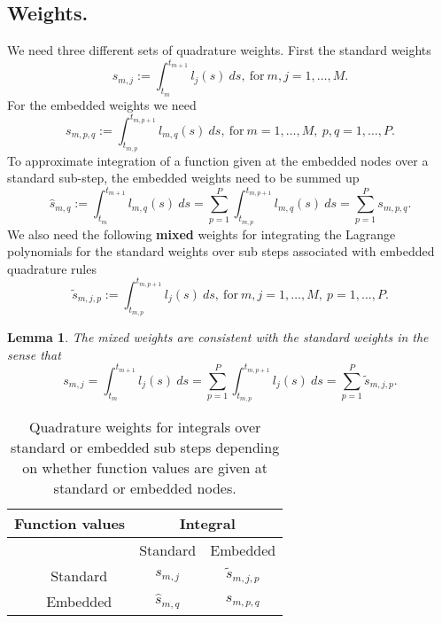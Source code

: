 \documentclass{article}
\newtheorem{lemma}{Lemma}
\begin{document}
\subsection*{Weights.}
We need three different sets of quadrature weights.
First the standard weights
\begin{equation}
	s_{m,j} := \int_{t_{m}}^{t_{m+1}} l_{j}(s)~ds, \ \text{for} \ m,j=1,\ldots,M.
\end{equation}
For the embedded weights we need
\begin{equation}
	s_{m,p,q} := \int_{t_{m,p}}^{t_{m,p+1}} l_{m,q}(s)~ds, \ \text{for} \ m=1,\ldots,M, \ p,q=1,\ldots,P.
\end{equation}
To approximate integration of a function given at the embedded nodes over a standard sub-step, the embedded weights need to be summed up
\begin{equation}
	\hat{s}_{m,q} := \int_{t_{m}}^{t_{m+1}} l_{m,q}(s)~ds = \sum_{p=1}^{P} \int_{t_{m,p}}^{t_{m,p+1}} l_{m,q}(s)~ds = \sum_{p=1}^{P} s_{m,p,q}.
\end{equation}
We also need the following \textbf{mixed} weights for integrating the Lagrange polynomials for the standard weights over sub steps associated with embedded quadrature rules
\begin{equation}
	\tilde{s}_{m,j,p} := \int_{t_{m,p}}^{t_{m,p+1}} l_{j}(s)~ds, \ \text{for} \ m,j=1,\ldots,M, \ p=1,\ldots,P.
\end{equation}
\begin{lemma}
The mixed weights are consistent with the standard weights in the sense that
\begin{equation}
	s_{m,j} = \int_{t_m}^{t_{m+1}} l_j(s)~ds = \sum_{p=1}^{P} \int_{t_{m,p}}^{t_{m,p+1}} l_j(s)~ds = \sum_{p=1}^{P} \tilde{s}_{m,j,p}.
\end{equation}
\end{lemma}

\begin{table}[h]
\centering
\begin{tabular}{|cc|cc|} \hline
\multicolumn{2}{|c|}{Function values} & \multicolumn{2}{c|}{Integral} \\ \hline
&          & Standard        & Embedded            \\ \hline
& Standard & $s_{m,j}$       & $\tilde{s}_{m,j,p}$ \\
& Embedded & $\hat{s}_{m,q}$ & $s_{m,p,q}$ \\ \hline
\end{tabular}
\caption{Quadrature weights for integrals over standard or embedded sub steps depending on whether function values are given at standard or embedded nodes.}
\end{table}
\end{document}
